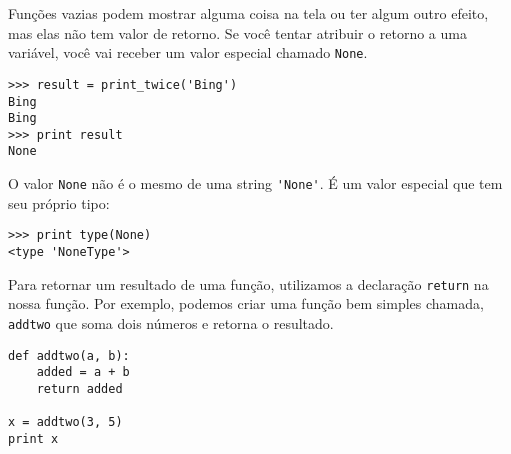 
Funções vazias podem mostrar alguma coisa na tela ou ter algum outro efeito,
mas elas não tem valor de retorno. Se você tentar atribuir o retorno a uma
variável, você vai receber um valor especial chamado {\tt None}.


\beforeverb
\begin{verbatim}
>>> result = print_twice('Bing')
Bing
Bing
>>> print result
None
\end{verbatim}
\afterverb
%

%
O valor {\tt None} não é o mesmo de uma string \verb"'None'". É um valor
especial que tem seu próprio tipo:

\beforeverb
\begin{verbatim}
>>> print type(None)
<type 'NoneType'>
\end{verbatim}
\afterverb
%

Para retornar um resultado de uma função, utilizamos a declaração
{\tt return} na nossa função. Por exemplo, podemos criar uma função bem
simples chamada, {\tt addtwo} que soma dois números e retorna o resultado.

\beforeverb
\begin{verbatim}
def addtwo(a, b):
    added = a + b
    return added

x = addtwo(3, 5)
print x
\end{verbatim}
\afterverb
%

